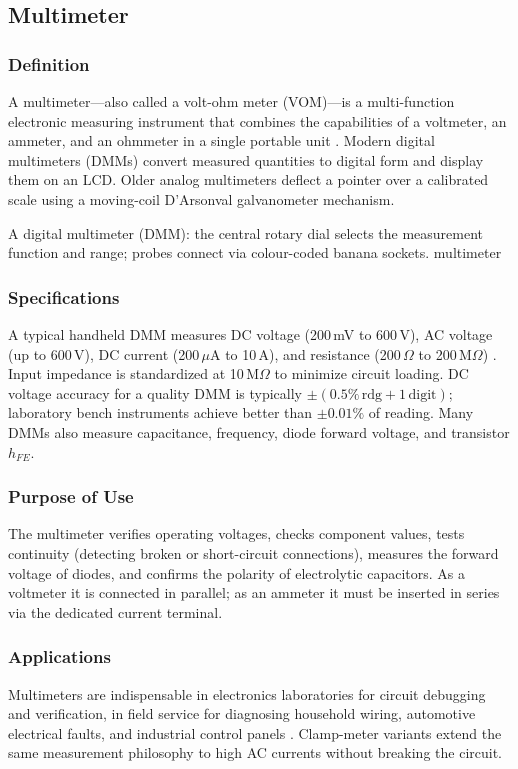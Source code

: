 \subsection{Multimeter}

\subsubsection*{Definition}
A multimeter---also called a volt-ohm meter (VOM)---is a multi-function electronic
measuring instrument that combines the capabilities of a voltmeter, an ammeter, and an
ohmmeter in a single portable unit \cite{wiki:multimeter}. Modern digital multimeters
(DMMs) convert measured quantities to digital form and display them on an LCD. Older
analog multimeters deflect a pointer over a calibrated scale using a moving-coil
D'Arsonval galvanometer mechanism.

%
  {A digital multimeter (DMM): the central rotary dial selects the
   measurement function and range; probes connect via colour-coded banana sockets.}%
  {multimeter}

\subsubsection*{Specifications}
A typical handheld DMM measures DC voltage (200\,mV to 600\,V), AC voltage (up to
600\,V), DC current (200\,$\mu$A to 10\,A), and resistance (200\,$\Omega$ to
200\,M$\Omega$) \cite{electronicsclub:multimeter}. Input impedance is standardized at
10\,M$\Omega$ to minimize circuit loading. DC voltage accuracy for a quality DMM is
typically $\pm(0.5\%\,\mathrm{rdg} + 1\,\mathrm{digit})$; laboratory bench instruments
achieve better than $\pm0.01\%$ of reading. Many DMMs also measure capacitance,
frequency, diode forward voltage, and transistor $h_{FE}$.

\subsubsection*{Purpose of Use}
The multimeter verifies operating voltages, checks component values, tests continuity
(detecting broken or short-circuit connections), measures the forward voltage of diodes,
and confirms the polarity of electrolytic capacitors. As a voltmeter it is connected
in parallel; as an ammeter it must be inserted in series via the dedicated current
terminal.

\subsubsection*{Applications}
Multimeters are indispensable in electronics laboratories for circuit debugging and
verification, in field service for diagnosing household wiring, automotive electrical
faults, and industrial control panels \cite{wiki:multimeter}. Clamp-meter variants
extend the same measurement philosophy to high AC currents without breaking the circuit.
